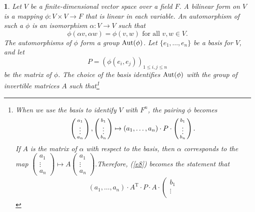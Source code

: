\documentclass[a4paper,11pt,final]{memoir}%
\newtheorem{plain}[X]{}
\theoremstyle{nonumberplain}
\begin{document}
\begin{plain}
\label{bd3f}Let $V$ be a finite-dimensional vector space over a field $F$. A
bilinear form on $V$ is a mapping $\phi\colon V\times V\rightarrow F$ that is
linear in each variable. An \emph{automorphism}%
of such a $\phi$ is an isomorphism $\alpha\colon V\rightarrow V$ such that%
\begin{equation}
\phi(\alpha v,\alpha w)=\phi(v,w)\text{ for all }v,w\in V. \label{e8}%
\end{equation}
The automorphisms of $\phi$ form a group $\operatorname{Aut}(\phi)$. Let $\{e_{1}%
,\ldots,e_{n}\}$ be a basis for $V$, and let%
\[
P=(\phi(e_{i},e_{j}))_{1\leq i,j\leq n}%
\]
be the matrix of $\phi$. The choice of the basis identifies $\operatorname{Aut}(\phi)$ with
the group of invertible matrices $A$ such that\footnote{When we use the basis
to identify $V$ with $F^{n}$, the pairing $\phi$ becomes%
\[
\left(
\begin{smallmatrix}
\vphantom{b}a_{1}\\
\vdots\\
\vphantom{b}a_{n}%
\end{smallmatrix}
\right)  ,\left(
\begin{smallmatrix}
b_{1}\\
\vdots\\
b_{n}%
\end{smallmatrix}
\right)  \mapsto(a_{1},\ldots,a_{n})\cdot P\cdot\left(
\begin{smallmatrix}
b_{1}\\
\vdots\\
b_{n}%
\end{smallmatrix}
\right)  .
\]
If $A$ is the matrix of $\alpha$ with respect to the basis, then $\alpha$
corresponds to the map $\left(
\begin{smallmatrix}
a_{1}\\
\vdots\\
a_{n}%
\end{smallmatrix}
\right)  \mapsto A\left(
\begin{smallmatrix}
a_{1}\\
\vdots\\
a_{n}%
\end{smallmatrix}
\right)  .$Therefore, (\ref{e8}) becomes the statement that%
\begin{align*}
(a_{1},\ldots,a_{n})\cdot A^{\mathrm{T}}\cdot P\cdot A\cdot\left(
\begin{smallmatrix}
b_{1}\\
\vdots\\

\end{smallmatrix}
\end{align*}}
\end{plain}
\end{document}

